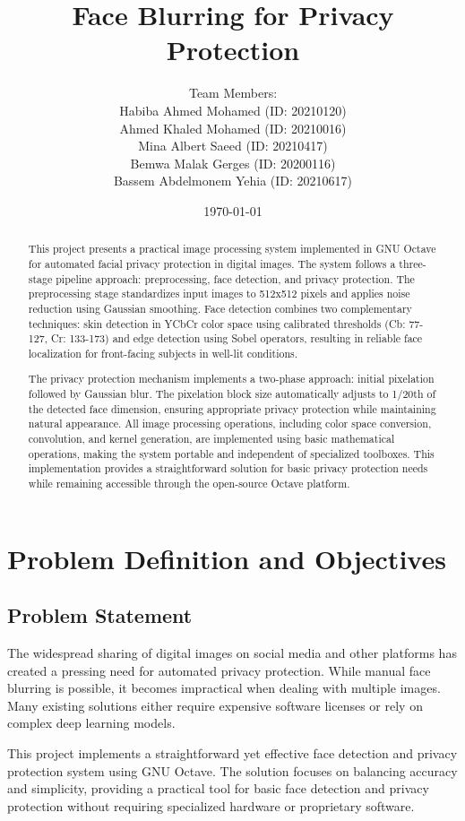 \documentclass[12pt,a4paper]{article}
\title{Face Blurring for Privacy Protection}
\author{
Team Members: \\[0.5em]
Habiba Ahmed Mohamed (ID: 20210120) \\
Ahmed Khaled Mohamed (ID: 20210016) \\
Mina Albert Saeed (ID: 20210417) \\
Bemwa Malak Gerges (ID: 20200116) \\
Bassem Abdelmonem Yehia (ID: 20210617) \\
}
\date{\today}
\begin{document}
\maketitle

\begin{abstract}
This project presents a practical image processing system implemented in GNU Octave for automated facial privacy protection in digital images. The system follows a three-stage pipeline approach: preprocessing, face detection, and privacy protection. The preprocessing stage standardizes input images to 512x512 pixels and applies noise reduction using Gaussian smoothing. Face detection combines two complementary techniques: skin detection in YCbCr color space using calibrated thresholds (Cb: 77-127, Cr: 133-173) and edge detection using Sobel operators, resulting in reliable face localization for front-facing subjects in well-lit conditions.

The privacy protection mechanism implements a two-phase approach: initial pixelation followed by Gaussian blur. The pixelation block size automatically adjusts to 1/20th of the detected face dimension, ensuring appropriate privacy protection while maintaining natural appearance. All image processing operations, including color space conversion, convolution, and kernel generation, are implemented using basic mathematical operations, making the system portable and independent of specialized toolboxes. This implementation provides a straightforward solution for basic privacy protection needs while remaining accessible through the open-source Octave platform.
\end{abstract}

\section{Problem Definition and Objectives}
\subsection{Problem Statement}
The widespread sharing of digital images on social media and other platforms has created a pressing need for automated privacy protection. While manual face blurring is possible, it becomes impractical when dealing with multiple images. Many existing solutions either require expensive software licenses or rely on complex deep learning models.

This project implements a straightforward yet effective face detection and privacy protection system using GNU Octave. The solution focuses on balancing accuracy and simplicity, providing a practical tool for basic face detection and privacy protection without requiring specialized hardware or proprietary software.
\end{document}
